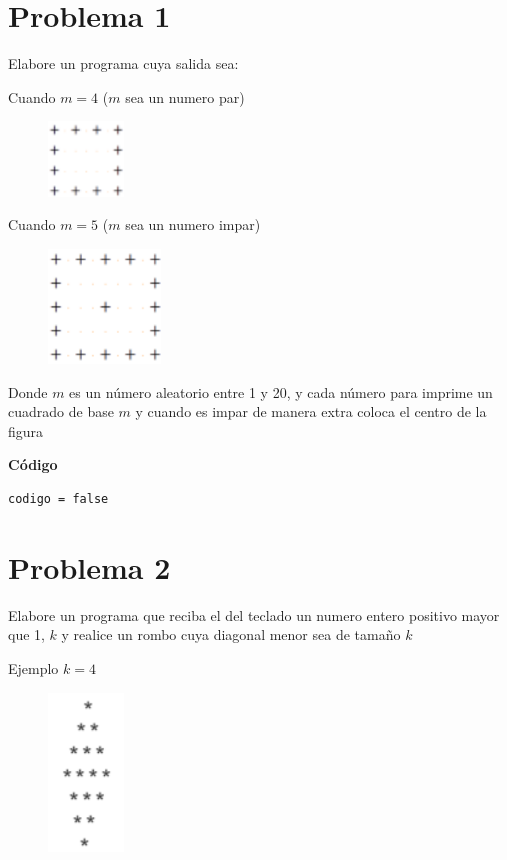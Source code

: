 \documentclass[12pt]{article}
\begin{document}
    \section*{Problema 1}
    Elabore un programa cuya salida sea:

    Cuando $m = 4$ ($m$ sea un numero par)
    \begin{figure}[h]
        \includegraphics[width=2cm]{Cuadrado1.png}
    \end{figure}

    Cuando $m = 5$ ($m$ sea un numero impar)
    \begin{figure}[h]
        \includegraphics[width=3cm]{Cuadrado2.png}
    \end{figure}

    Donde $m$ es un número aleatorio entre 1 y 20, y cada número para imprime un cuadrado de base $m$ y cuando es impar de manera extra coloca el centro de la figura

    \hfil \break
    \textbf{Código}
    \begin{lstlisting}
codigo = false
    \end{lstlisting}

    \section*{Problema 2}
    Elabore un programa que reciba el del teclado un numero entero positivo mayor que 1, $k$ y realice un rombo cuya diagonal menor sea de tamaño $k$

    Ejemplo $k = 4$
    \begin{figure}[h]
        \includegraphics[width=2cm]{Rombo.png}
    \end{figure}
\end{document}
